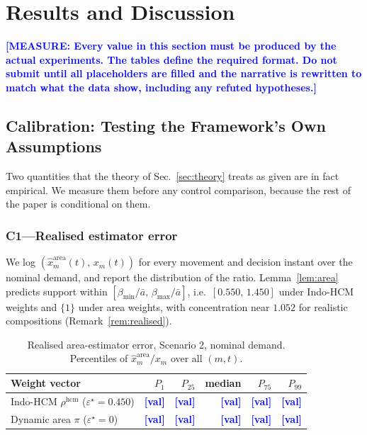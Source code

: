 \documentclass[journal]{IEEEtran}
\newcommand{\note}[1]{\textcolor{blue}{\textbf{[MEASURE: #1]}}}
\newcommand{\pl}{\textcolor{blue}{\textbf{[val]}}}
\begin{document}
\section{Results and Discussion}
\label{sec:results}
\note{Every value in this section must be produced by the actual
experiments. The tables define the required format. Do not submit until
all placeholders are filled and the narrative is rewritten to match what
the data show, including any refuted hypotheses.}

\subsection{Calibration: Testing the Framework's Own Assumptions}
\label{subsec:calibration}
Two quantities that the theory of Sec.~\ref{sec:theory} treats as given
are in fact empirical. We measure them before any control comparison,
because the rest of the paper is conditional on them.

\subsubsection{C1---Realised estimator error}
We log $(\hat{x}^{\mathrm{area}}_m(t),\,x_m(t))$ for every movement and
decision instant over the nominal demand, and report the distribution of
the ratio. Lemma~\ref{lem:area} predicts support within
$[\beta_{\min}/\bar a,\,\beta_{\max}/\bar a]$, i.e.\ $[0.550,\,1.450]$
under Indo-HCM weights and $\{1\}$ under area weights, with concentration
near $1.052$ for realistic compositions (Remark~\ref{rem:realised}).

\begin{table}[htbp]
\caption{Realised area-estimator error, Scenario 2, nominal demand.
Percentiles of $\hat{x}^{\mathrm{area}}_m/x_m$ over all $(m,t)$.}
\label{tab:calib_eps}
\centering
\footnotesize
\begin{tabularx}{\columnwidth}{@{}Xrrrrr@{}}
\toprule
Weight vector & $P_1$ & $P_{25}$ & median & $P_{75}$ & $P_{99}$ \\
\midrule
Indo-HCM $\rho^{\mathrm{hcm}}$ ($\varepsilon^\star=0.450$) & \pl & \pl & \pl & \pl & \pl \\
Dynamic area $\pi$ ($\varepsilon^\star=0$)                 & \pl & \pl & \pl & \pl & \pl \\
\bottomrule
\end{tabularx}
\end{table}
\end{document}
